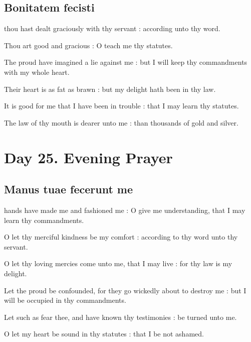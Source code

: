 \subsection{Bonitatem fecisti}
 thou hast dealt graciously with thy servant : according unto thy word.\par
{}
Thou art good and gracious : O teach me thy statutes.\par
{}The proud have imagined a lie against me : but I will keep thy commandments with my whole heart.\par
{}Their heart is as fat as brawn : but my delight hath been in thy law.\par
{}It is good for me that I have been in trouble : that I may learn thy statutes.\par
{}The law of thy mouth is dearer unto me : than thousands of gold and silver.\par

\section*{Day 25. Evening Prayer}

\subsection{Manus tuae fecerunt me}
 hands have made me and fashioned me : O give me understanding, that I may learn thy commandments.\par
{}
O let thy merciful kindness be my comfort : according to thy word unto thy servant.\par
{}O let thy loving mercies come unto me, that I may live : for thy law is my delight.\par
{}Let the proud be confounded, for they go wickedly about to destroy me : but I will be occupied in thy commandments.\par
{}Let such as fear thee, and have known thy testimonies : be turned unto me.\par
{}O let my heart be sound in thy statutes : that I be not ashamed.\par

